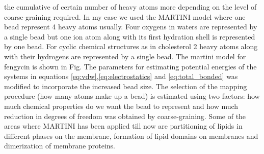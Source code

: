 the cumulative of certain number of heavy atoms more depending on the level of 
coarse-graining required. In my case we used the MARTINI model where one bead represent 4 
heavy atoms usually. Four oxygens in waters are represented by a single bead but one ion 
atom along with its first hydration shell is represented by one bead. For cyclic chemical 
structures as in cholesterol 2 heavy atoms along with their hydrogens are represented by a 
single bead. The martini model for fengycin is shown in  Fig. %
The parameters for estimating potential energies of the systems in equations 
\ref{eq:vdw},\ref{eq:electrostatics} and \ref{eq:total_bonded} was modified to incorporate 
the increased bead size. The selection of the mapping procedure (how many atoms make up a 
bead) is estimated using two factors: how much chemical properties do we want the bead to 
represent and how much reduction in degrees of freedom was obtained by coarse-graining.
Some of the areas where MARTINI has been applied till now are partitioning of lipids in 
different phases on the membrane\cite{SCHAFER2010}, formation of lipid domains on membranes\cite{Wassall2008,pastorino2012} and dimerization of membrane proteins\cite{Huber2012}. 


